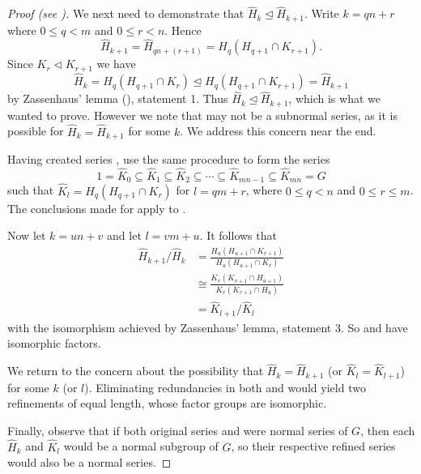 \begin{proof}[Proof (see {\cite[\S 72]{clark_1984}})]
    We next need to demonstrate that $\hat{H}_k \unlhd \hat{H}_{k+1}$. Write $k = qn+r$ where $0 \leq q < m$ and $0 \leq r < n$. Hence
    \[
        \hat{H}_{k+1} = \hat{H}_{qn+(r+1)} = H_q(H_{q+1}\cap K_{r+1}).
    \]
    Since $K_r \lhd K_{r+1}$ we have
    \[
        \hat{H}_k = H_q(H_{q+1}\cap K_r) \unlhd H_q(H_{q+1}\cap K_{r+1}) = \hat{H}_{k+1}
    \]
    by Zassenhaus' lemma (), statement 1. Thus $\hat{H}_k \unlhd \hat{H}_{k+1}$, which is what we wanted to prove. However we note that  may not be a subnormal series, as it is possible for $\hat{H}_k = \hat{H}_{k+1}$ for some $k$. We address this concern near the end.

    Having created series , use the same procedure to form the series
    \begin{equation}\label{eqn:thrm-schreier-eqn-b-prime}
        1 = \hat{K}_0 \subseteq \hat{K}_1 \subseteq \hat{K}_2 \subseteq \cdots \subseteq \hat{K}_{mn - 1} \subseteq \hat{K}_{mn} = G
        \tag{B'}
    \end{equation}
    such that $\hat{K}_l = H_q(H_{q+1}\cap K_r)$ for $l = qm + r$, where $0 \leq q < n$ and $0 \leq r \leq m$. The conclusions made for  apply to .

    Now let $k = un + v$ and let $l = vm + u$. It follows that
    \begin{align*}
        \hat{H}_{k+1}/\hat{H}_k &= \frac{H_u(H_{u+1}\cap K_{v+1})}{H_u(H_{u+1}\cap K_v)}\\
        &\cong \frac{K_v(K_{v+1}\cap H_{u+1})}{K_v(K_{v+1}\cap H_u)}\\
        &= \hat{K}_{l+1}/\hat{K}_l
    \end{align*}
    with the isomorphism achieved by Zassenhaus' lemma, statement 3. So  and  have isomorphic factors.

    We return to the concern about the possibility that $\hat{H}_k = \hat{H}_{k+1}$ (or $\hat{K}_l = \hat{K}_{l+1}$) for some $k$ (or $l$). Eliminating redundancies in both  and  would yield two refinements of equal length, whose factor groups are isomorphic.

    Finally, observe that if both original series  and  were normal series of $G$, then each $\hat{H}_k$ and $\hat{K}_l$ would be a normal subgroup of $G$, so their respective refined series would also be a normal series.
\end{proof}

